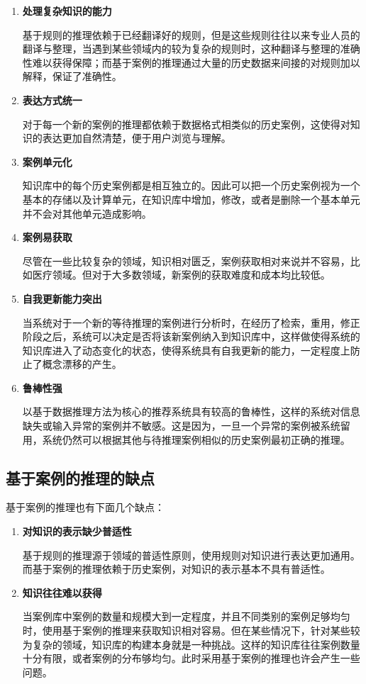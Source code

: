 \begin{enumerate}
  \item \textbf{处理复杂知识的能力}
  
  基于规则的推理依赖于已经翻译好的规则，但是这些规则往往以来专业人员的翻译与整理，当遇到某些领域内的较为复杂的规则时，这种翻译与整理的准确性难以获得保障；而基于案例的推理通过大量的历史数据来间接的对规则加以解释，保证了准确性。
  \item \textbf{表达方式统一}
  
  对于每一个新的案例的推理都依赖于数据格式相类似的历史案例，这使得对知识的表达更加自然清楚，便于用户浏览与理解。
  \item \textbf{案例单元化}
  
  知识库中的每个历史案例都是相互独立的。因此可以把一个历史案例视为一个基本的存储以及计算单元，在知识库中增加，修改，或者是删除一个基本单元并不会对其他单元造成影响。
  
  \item \textbf{案例易获取}
  
  尽管在一些比较复杂的领域，知识相对匮乏，案例获取相对来说并不容易，比如医疗领域。但对于大多数领域，新案例的获取难度和成本均比较低。
  
  \item \textbf{自我更新能力突出}
  
  当系统对于一个新的等待推理的案例进行分析时，在经历了检索，重用，修正阶段之后，系统可以决定是否将该新案例纳入到知识库中，这样做使得系统的知识库进入了动态变化的状态，使得系统具有自我更新的能力，一定程度上防止了概念漂移的产生。
  
  \item \textbf{鲁棒性强}
  
  以基于数据推理方法为核心的推荐系统具有较高的鲁棒性，这样的系统对信息缺失或输入异常的案例并不敏感。这是因为，一旦一个异常的案例被系统留用，系统仍然可以根据其他与待推理案例相似的历史案例最初正确的推理。
  

\end{enumerate}

\subsection{基于案例的推理的缺点}
基于案例的推理也有下面几个缺点：

\begin{enumerate}
  \item \textbf{对知识的表示缺少普适性}
  
  基于规则的推理源于领域的普适性原则，使用规则对知识进行表达更加通用。而基于案例的推理依赖于历史案例，对知识的表示基本不具有普适性。
  
  \item \textbf{知识往往难以获得}
  
  当案例库中案例的数量和规模大到一定程度，并且不同类别的案例足够均匀时，使用基于案例的推理来获取知识相对容易。但在某些情况下，针对某些较为复杂的领域，知识库的构建本身就是一种挑战。这样的知识库往往案例数量十分有限，或者案例的分布够均匀。此时采用基于案例的推理也许会产生一些问题\cite{Sabater1998Using,Oh2013Introduction}。

\end{enumerate}


